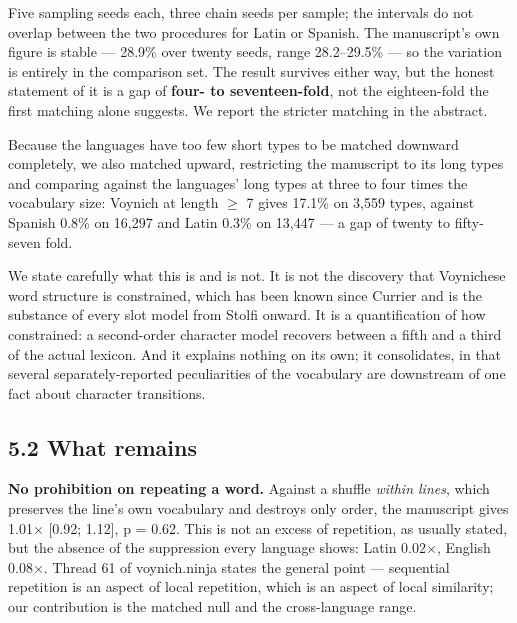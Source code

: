 \documentclass[11pt,a4paper]{article}
\begin{document}
Five sampling seeds each, three chain seeds per sample; the intervals do not overlap between the two procedures for Latin or Spanish. The manuscript's own figure is stable --- 28.9\% over twenty seeds, range 28.2--29.5\% --- so the variation is entirely in the comparison set. The result survives either way, but the honest statement of it is a gap of \textbf{four- to seventeen-fold}, not the eighteen-fold the first matching alone suggests. We report the stricter matching in the abstract.


Because the languages have too few short types to be matched downward completely, we also matched upward, restricting the manuscript to its long types and comparing against the languages' long types at three to four times the vocabulary size: Voynich at length $\geq$ 7 gives 17.1\% on 3,559 types, against Spanish 0.8\% on 16,297 and Latin 0.3\% on 13,447 --- a gap of twenty to fifty-seven fold.


We state carefully what this is and is not. It is not the discovery that Voynichese word structure is constrained, which has been known since Currier and is the substance of every slot model from Stolfi onward. It is a quantification of how constrained: a second-order character model recovers between a fifth and a third of the actual lexicon. And it explains nothing on its own; it consolidates, in that several separately-reported peculiarities of the vocabulary are downstream of one fact about character transitions.


\subsection*{5.2 What remains}


\textbf{No prohibition on repeating a word.} Against a shuffle \emph{within lines}, which preserves the line's own vocabulary and destroys only order, the manuscript gives 1.01$\times$ [0.92; 1.12], p = 0.62. This is not an excess of repetition, as usually stated, but the absence of the suppression every language shows: Latin 0.02$\times$, English 0.08$\times$. Thread 61 of voynich.ninja states the general point --- sequential repetition is an aspect of local repetition, which is an aspect of local similarity; our contribution is the matched null and the cross-language range.
\end{document}
